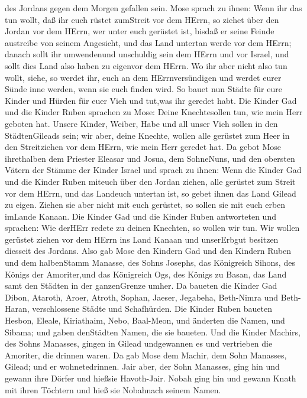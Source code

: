 des Jordans gegen dem Morgen gefallen sein.  Mose sprach zu
ihnen: Wenn ihr das tun wollt, daß ihr euch rüstet zumStreit vor dem
HErrn,  so ziehet über den Jordan vor dem HErrn, wer unter
euch gerüstet ist, bisdaß er seine Feinde austreibe von seinem
Angesicht,  und das Land untertan werde vor dem HErrn;
danach sollt ihr umwendenund unschuldig sein dem HErrn und vor Israel,
und sollt dies Land also haben zu eigenvor dem HErrn.  Wo
ihr aber nicht also tun wollt, siehe, so werdet ihr, euch an dem
HErrnversündigen und werdet eurer Sünde inne werden, wenn sie euch
finden wird.  So bauet nun Städte für eure Kinder und
Hürden für euer Vieh und tut,was ihr geredet habt.  Die
Kinder Gad und die Kinder Ruben sprachen zu Mose: Deine Knechtesollen
tun, wie mein Herr geboten hat.  Unsere Kinder, Weiber,
Habe und all unser Vieh sollen in den StädtenGileads sein; 
wir aber, deine Knechte, wollen alle gerüstet zum Heer in den
Streitziehen vor dem HErrn, wie mein Herr geredet hat.  Da
gebot Mose ihrethalben dem Priester Eleasar und Josua, dem SohneNuns,
und den obersten Vätern der Stämme der Kinder Israel  und
sprach zu ihnen: Wenn die Kinder Gad und die Kinder Ruben miteuch über
den Jordan ziehen, alle gerüstet zum Streit vor dem HErrn, und das
Landeuch untertan ist, so gebet ihnen das Land Gilead zu eigen.
 Ziehen sie aber nicht mit euch gerüstet, so sollen sie mit
euch erben imLande Kanaan.  Die Kinder Gad und die Kinder
Ruben antworteten und sprachen: Wie derHErr redete zu deinen Knechten,
so wollen wir tun.  Wir wollen gerüstet ziehen vor dem
HErrn ins Land Kanaan und unserErbgut besitzen diesseit des Jordans.
 Also gab Mose den Kindern Gad und den Kindern Ruben und
dem halbenStamm Manasse, des Sohns Josephs, das Königreich Sihons, des
Königs der Amoriter,und das Königreich Ogs, des Königs zu Basan, das
Land samt den Städten in der ganzenGrenze umher.  Da
baueten die Kinder Gad Dibon, Ataroth, Aroer,  Atroth,
Sophan, Jaeser, Jegabeha,  Beth-Nimra und Beth-Haran,
verschlossene Städte und Schafhürden.  Die Kinder Ruben
baueten Hesbon, Eleale, Kiriathaim,  Nebo, Baal-Meon, und
änderten die Namen, und Sibama; und gaben denStädten Namen, die sie
baueten.  Und die Kinder Machirs, des Sohns Manasses,
gingen in Gilead undgewannen es und vertrieben die Amoriter, die drinnen
waren.  Da gab Mose dem Machir, dem Sohn Manasses, Gilead;
und er wohnetedrinnen.  Jair aber, der Sohn Manasses, ging
hin und gewann ihre Dörfer und hießsie Havoth-Jair.  Nobah
ging hin und gewann Knath mit ihren Töchtern und hieß sie Nobahnach
seinem Namen.

